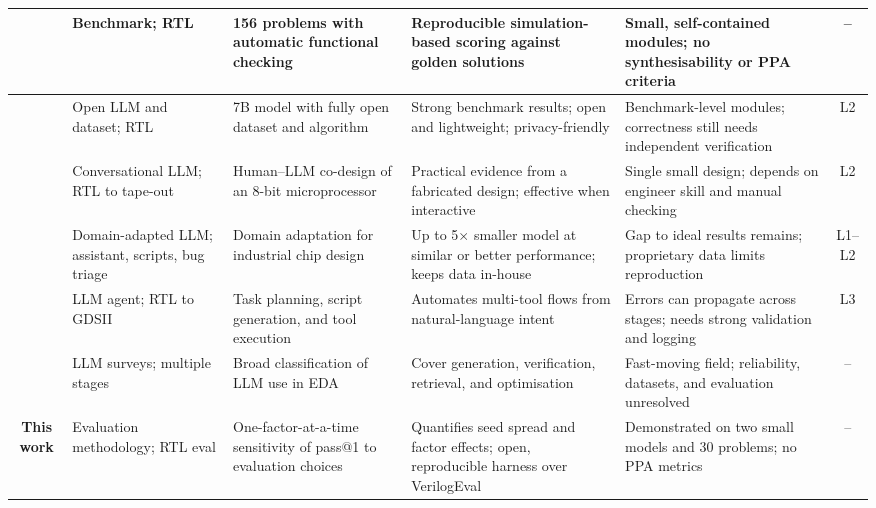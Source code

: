 \documentclass[conference]{IEEEtran}
\begin{document}
\begin{table}[!t]
\begin{tabularx}{\textwidth}{|c|p{2.2cm}|Y|Y|Y|c|}
\hline
\cite{P12_Liu2023} & Benchmark; RTL & 156 problems with automatic functional checking & Reproducible simulation-based scoring against golden solutions & Small, self-contained modules; no synthesisability or PPA criteria & -- \\
\hline
\cite{P4_Liu2025} & Open LLM and dataset; RTL & 7B model with fully open dataset and algorithm & Strong benchmark results; open and lightweight; privacy-friendly & Benchmark-level modules; correctness still needs independent verification & L2 \\
\hline
\cite{P13_Blocklove2023} & Conversational LLM; RTL to tape-out & Human--LLM co-design of an 8-bit microprocessor & Practical evidence from a fabricated design; effective when interactive & Single small design; depends on engineer skill and manual checking & L2 \\
\hline
\cite{P14_Liu2023ChipNeMo} & Domain-adapted LLM; assistant, scripts, bug triage & Domain adaptation for industrial chip design & Up to 5$\times$ smaller model at similar or better performance; keeps data in-house & Gap to ideal results remains; proprietary data limits reproduction & L1--L2 \\
\hline
\cite{P5_Wu2024} & LLM agent; RTL to GDSII & Task planning, script generation, and tool execution & Automates multi-tool flows from natural-language intent & Errors can propagate across stages; needs strong validation and logging & L3 \\
\hline
\cite{P6_Pan2025,P7_He2025} & LLM surveys; multiple stages & Broad classification of LLM use in EDA & Cover generation, verification, retrieval, and optimisation & Fast-moving field; reliability, datasets, and evaluation unresolved & -- \\
\hline
\textbf{This work} & Evaluation methodology; RTL eval & One-factor-at-a-time sensitivity of pass@1 to evaluation choices & Quantifies seed spread and factor effects; open, reproducible harness over VerilogEval & Demonstrated on two small models and 30 problems; no PPA metrics & -- \\
\hline
\end{tabularx}
\end{table}
\end{document}
